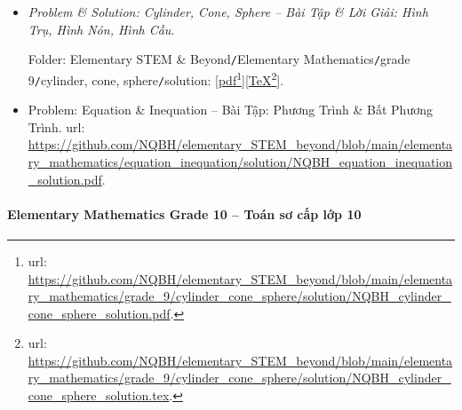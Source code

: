 \documentclass[12pt]{article}
\begin{document}
\begin{itemize}
\begin{center}
	\end{center}
	Folder: {\sf Elementary STEM \& Beyond{\tt/}Elementary Mathematics{\tt/}grade 9{\tt/}cylinder, cone, sphere{\tt/}problem}: [\href{https://github.com/NQBH/elementary_STEM_beyond/blob/main/elementary_mathematics/grade_9/cylinder_cone_sphere/problem/NQBH_cylinder_cone_sphere_problem.pdf}{pdf}\footnote{{\sc url}: \url{https://github.com/NQBH/elementary_STEM_beyond/blob/main/elementary_mathematics/grade_9/cylinder_cone_sphere/problem/NQBH_cylinder_cone_sphere_problem.pdf}.}][\href{https://github.com/NQBH/elementary_STEM_beyond/blob/main/elementary_mathematics/grade_9/cylinder_cone_sphere/problem/NQBH_cylinder_cone_sphere_problem.tex}{\TeX}\footnote{{\sc url}: \url{https://github.com/NQBH/elementary_STEM_beyond/blob/main/elementary_mathematics/grade_9/cylinder_cone_sphere/problem/NQBH_cylinder_cone_sphere_problem.tex}.}].
	\item {\it Problem \& Solution: Cylinder, Cone, Sphere -- Bài Tập \& Lời Giải: Hình Trụ, Hình Nón, Hình Cầu}.
	
	Folder: {\sf Elementary STEM \& Beyond{\tt/}Elementary Mathematics{\tt/}grade 9{\tt/}cylinder, cone, sphere{\tt/}solution}: [\href{https://github.com/NQBH/elementary_STEM_beyond/blob/main/elementary_mathematics/grade_9/cylinder_cone_sphere/solution/NQBH_cylinder_cone_sphere_solution.pdf}{pdf}\footnote{{\sc url}: \url{https://github.com/NQBH/elementary_STEM_beyond/blob/main/elementary_mathematics/grade_9/cylinder_cone_sphere/solution/NQBH_cylinder_cone_sphere_solution.pdf}.}][\href{https://github.com/NQBH/elementary_STEM_beyond/blob/main/elementary_mathematics/grade_9/cylinder_cone_sphere/solution/NQBH_cylinder_cone_sphere_solution.tex}{\TeX}\footnote{{\sc url}: \url{https://github.com/NQBH/elementary_STEM_beyond/blob/main/elementary_mathematics/grade_9/cylinder_cone_sphere/solution/NQBH_cylinder_cone_sphere_solution.tex}.}].	
	\item Problem: Equation \& Inequation -- Bài Tập: Phương Trình \& Bất Phương Trình. {\sc url}: \url{https://github.com/NQBH/elementary_STEM_beyond/blob/main/elementary_mathematics/equation_inequation/solution/NQBH_equation_inequation_solution.pdf}.
\end{itemize}

\paragraph{Elementary Mathematics Grade 10 -- Toán sơ cấp lớp 10}
\end{document}
